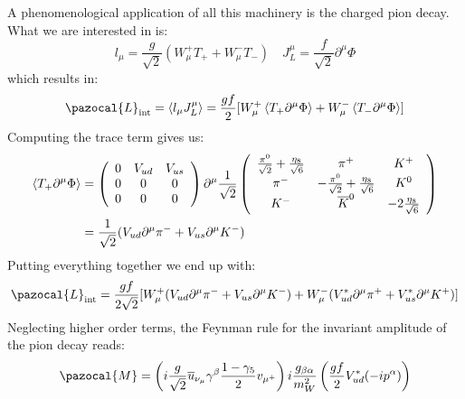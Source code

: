 \documentclass[../main.tex]{subfiles}
\begin{document}
\begin{kaobox}[frametitle=Charged Pion Decay]
A phenomenological application of all this machinery is the charged pion decay. What we are interested in is:
\[
l_\mu=\frac{g}{\sqrt{2}}(W_\mu^+T_++W_\mu^-T_-) \quad J_L^\mu=\frac{f}{\sqrt{2}}\partial^\mu\Phi
\]
which results in:
\[
\pazocal{L}_{\text{int}}=\Braket{l_\mu J^\mu_L}=\frac{gf}{2}[W_\mu^+\Braket{T_+\partial^\mu\Phi}+W_\mu^-\Braket{T_-\partial^\mu\Phi}]
\]
Computing the trace term gives us:
\begin{align*}
\Braket{T_+\partial^\mu\Phi}&=\left(\begin{array}{ccc}
    0 & V_{ud} & V_{us} \\
    0 & 0 & 0 \\
    0 & 0 & 0
\end{array}\right)\partial^\mu\frac{1}{\sqrt{2}}\left(\begin{array}{ccc}
    \frac{\pi^0}{\sqrt{2}}+\frac{\eta_8}{\sqrt{6}} & \pi^+ & K^+ \\
    \pi^- & -\frac{\pi^0}{\sqrt{2}}+\frac{\eta_8}{\sqrt{6}} & K^0 \\
    K^- & \overline{K}^0 & -2\frac{\eta_8}{\sqrt{6}} \\
\end{array}\right)\\
&=\frac{1}{\sqrt{2}}(V_{ud}\partial^\mu\pi^-+V_{us}\partial^\mu K^-)
\end{align*}
Putting everything together we end up with:
\[
\pazocal{L}_{\text{int}}=\frac{gf}{2\sqrt{2}}[W_\mu^+(V_{ud}\partial^\mu\pi^-+V_{us}\partial^\mu K^-)+W_\mu^-(V_{ud}^*\partial^\mu\pi^++V_{us}^*\partial^\mu K^+)]
\]
Neglecting higher order terms, the Feynman rule for the invariant amplitude of the pion decay reads:
\begin{align*}
\pazocal{M}&=\left(i\frac{g}{\sqrt{2}}\overline{u}_{\nu_\mu}\gamma^\beta\frac{1-\gamma_5}{2}v_{\mu^+}\right)i\frac{g_{\beta\alpha}}{m_W^2}\left(\frac{gf}{2}V_{ud}^*(-ip^\alpha)\right)\\

\end{align*}
\end{kaobox}
\end{document}
